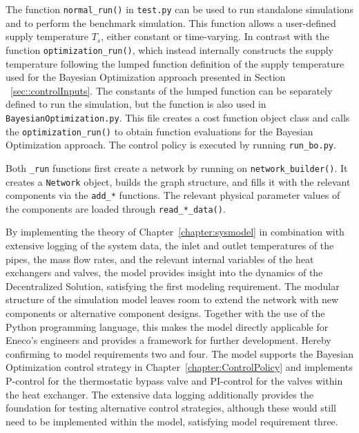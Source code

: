 The function \texttt{normal\_run()} in \texttt{test.py} can be used to run standalone simulations and to perform the benchmark simulation. This function allows a user-defined supply temperature $T_{s}$, either constant or time-varying. In contrast with the function \texttt{optimization\_run()}, which instead internally constructs the supply temperature following the lumped function definition of the supply temperature used for the Bayesian Optimization approach presented in Section ~\ref{sec::controlInputs}. The constants of the lumped function can be separately defined to run the simulation, but the function is also used in \texttt{BayesianOptimization.py}. This file creates a cost function object class and calls the \texttt{optimization\_run()} to obtain function evaluations for the Bayesian Optimization approach. The control policy is executed by running \texttt{run\_bo.py}. 

Both \texttt{\_run} functions first create a network by running on \texttt{network\_builder()}. It creates a \texttt{Network} object, builds the graph structure, and fills it with the relevant components via the \texttt{add\_*} functions. The relevant physical parameter values of the components are loaded through \texttt{read\_*\_data()}. 

By implementing the theory of Chapter~\ref{chapter:sysmodel} in combination with extensive logging of the system data, the inlet and outlet temperatures of the pipes, the mass flow rates, and the relevant internal variables of the heat exchangers and valves, the model provides insight into the dynamics of the Decentralized Solution, satisfying the first modeling requirement. The modular 
structure of the simulation model leaves room to extend the network with new components or alternative component designs. Together with the use of the Python programming language, this makes the model directly applicable for Eneco's engineers and provides a framework for further development. Hereby confirming to model requirements two and four. The model supports the Bayesian Optimization control strategy in Chapter~\ref{chapter:ControlPolicy} and implements P-control for the thermostatic bypass valve and PI-control for the valves within the heat exchanger. The extensive data logging additionally provides the foundation for testing alternative control strategies, although these would still need to be implemented within the model, satisfying model requirement three. 


